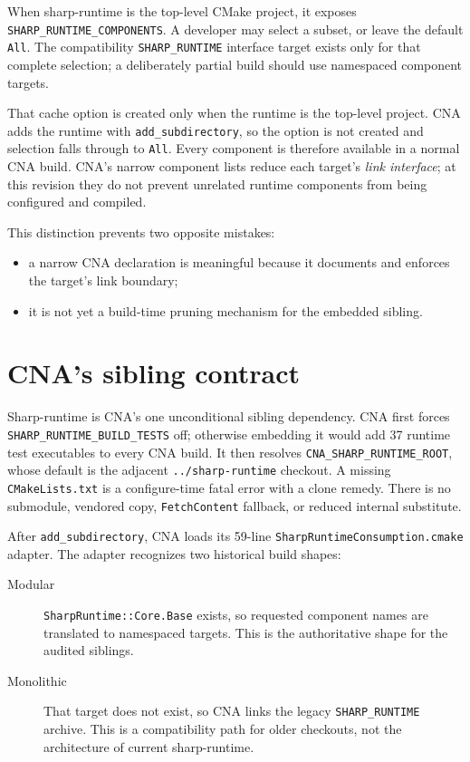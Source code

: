 When sharp-runtime is the top-level CMake project, it exposes
\texttt{SHARP\_RUNTIME\_COMPONENTS}. A developer may select a subset, or leave the default
\texttt{All}. The compatibility \texttt{SHARP\_RUNTIME} interface target exists only for that
complete selection; a deliberately partial build should use namespaced component targets.

That cache option is created only when the runtime is the top-level project. CNA adds the
runtime with \texttt{add\_subdirectory}, so the option is not created and selection falls
through to \texttt{All}. Every component is therefore available in a normal CNA build. CNA's
narrow component lists reduce each target's \emph{link interface}; at this revision they do
not prevent unrelated runtime components from being configured and compiled.

This distinction prevents two opposite mistakes:

\begin{itemize}
  \item a narrow CNA declaration is meaningful because it documents and enforces the target's
        link boundary;
  \item it is not yet a build-time pruning mechanism for the embedded sibling.
\end{itemize}

\section{CNA's sibling contract}

Sharp-runtime is CNA's one unconditional sibling dependency. CNA first forces
\texttt{SHARP\_RUNTIME\_BUILD\_TESTS} off; otherwise embedding it would add 37 runtime test
executables to every CNA build. It then resolves \texttt{CNA\_SHARP\_RUNTIME\_ROOT}, whose
default is the adjacent \texttt{../sharp-runtime} checkout. A missing
\texttt{CMakeLists.txt} is a configure-time fatal error with a clone remedy. There is no
submodule, vendored copy, \texttt{FetchContent} fallback, or reduced internal substitute.

After \texttt{add\_subdirectory}, CNA loads its 59-line
\texttt{SharpRuntimeConsumption.cmake} adapter. The adapter recognizes two historical build
shapes:

\begin{description}
  \item[Modular] \texttt{SharpRuntime::Core.Base} exists, so requested component names are
  translated to namespaced targets. This is the authoritative shape for the audited siblings.
  \item[Monolithic] That target does not exist, so CNA links the legacy
  \texttt{SHARP\_RUNTIME} archive. This is a compatibility path for older checkouts, not the
  architecture of current sharp-runtime.
\end{description}

